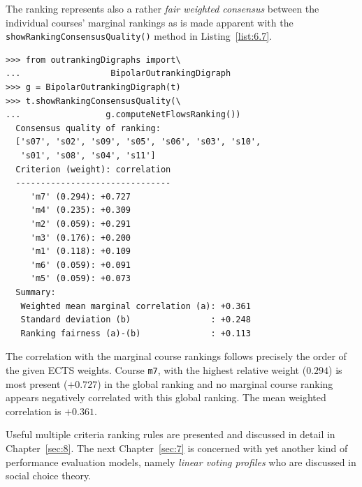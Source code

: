 The \NetFlows ranking represents also a rather \emph{fair weighted consensus} between the individual courses' marginal rankings as is made apparent with the \texttt{showRankingConsensusQuality()} method in Listing~\vref{list:6.7}.
\begin{lstlisting}[caption={Consensus quality of the students's ranking},label=list:6.7]
>>> from outrankingDigraphs import\
...                  BipolarOutrankingDigraph
>>> g = BipolarOutrankingDigraph(t)
>>> t.showRankingConsensusQuality(\
...                 g.computeNetFlowsRanking())
  Consensus quality of ranking:
  ['s07', 's02', 's09', 's05', 's06', 's03', 's10',
   's01', 's08', 's04', 's11']
  Criterion (weight): correlation
  -------------------------------
     'm7' (0.294): +0.727
     'm4' (0.235): +0.309
     'm2' (0.059): +0.291
     'm3' (0.176): +0.200
     'm1' (0.118): +0.109
     'm6' (0.059): +0.091
     'm5' (0.059): +0.073
  Summary:
   Weighted mean marginal correlation (a): +0.361
   Standard deviation (b)                : +0.248
   Ranking fairness (a)-(b)              : +0.113
\end{lstlisting}

The correlation with the marginal course rankings follows precisely the order of the given ECTS weights. Course \texttt{m7}, with the highest relative weight ($0.294$) is most present ($+0.727$) in the global \NetFlows ranking and no marginal course ranking appears negatively correlated with this global ranking. The mean weighted correlation is $+0.361$.

\vspace{\baselineskip}
Useful multiple criteria ranking rules are presented and discussed in detail in Chapter~\ref{sec:8}. The next Chapter~\ref{sec:7} is concerned with yet another kind of performance evaluation models, namely \emph{linear voting profiles} who are discussed in social choice theory.

% 


